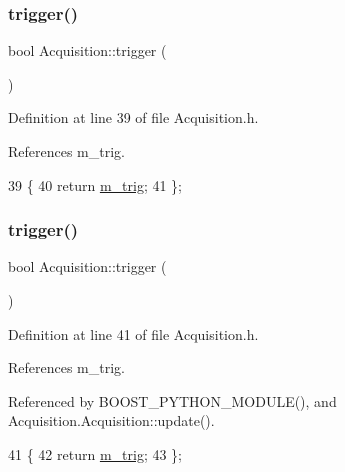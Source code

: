 \subsubsection{\texorpdfstring{trigger()}{trigger()}\hspace{0.1cm}{\footnotesize\ttfamily [1/2]}}
{\footnotesize\ttfamily bool Acquisition\+::trigger (\begin{DoxyParamCaption}{ }\end{DoxyParamCaption})\hspace{0.3cm}{\ttfamily [inline]}}



Definition at line 39 of file Acquisition.\+h.



References m\+\_\+trig.


\begin{DoxyCode}
39                  \{
40     \textcolor{keywordflow}{return} \hyperlink{classAcquisition_a953bdc1bf56206b6df33b648af32a24f}{m\_trig};
41   \};
\end{DoxyCode}
\mbox{\label{classAcquisition_a6f680938eb6a42d57dfa7466e8852af9}} 
\subsubsection{\texorpdfstring{trigger()}{trigger()}\hspace{0.1cm}{\footnotesize\ttfamily [2/2]}}
{\footnotesize\ttfamily bool Acquisition\+::trigger (\begin{DoxyParamCaption}{ }\end{DoxyParamCaption})\hspace{0.3cm}{\ttfamily [inline]}}



Definition at line 41 of file Acquisition.\+h.



References m\+\_\+trig.



Referenced by B\+O\+O\+S\+T\+\_\+\+P\+Y\+T\+H\+O\+N\+\_\+\+M\+O\+D\+U\+L\+E(), and Acquisition.\+Acquisition\+::update().


\begin{DoxyCode}
41                  \{
42     \textcolor{keywordflow}{return} \hyperlink{classAcquisition_a953bdc1bf56206b6df33b648af32a24f}{m\_trig};
43   \};
\end{DoxyCode}


